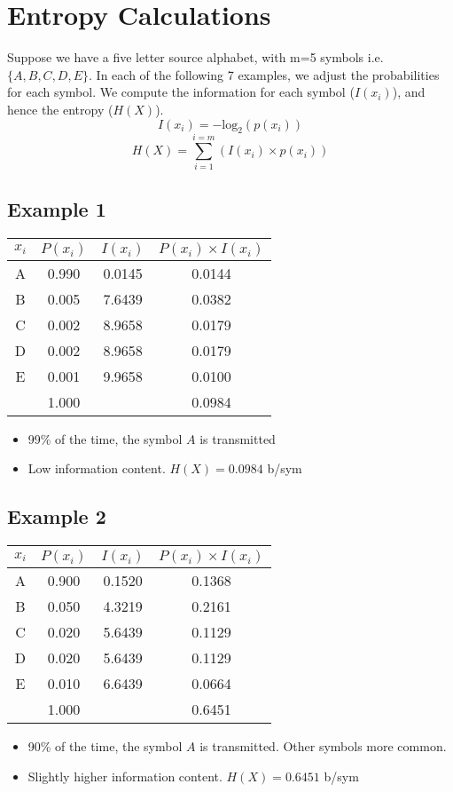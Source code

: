 \documentclass[12pt]{article}
\begin{document}
\section*{Entropy Calculations}
Suppose we have a five letter source alphabet, with m=5 symbols i.e. $\{A,B,C,D,E\}$.
In each of the following 7 examples, we adjust the probabilities for each symbol. We compute the information for each symbol ($I(x_i)$), and hence the entropy ($H(X)$).
\[ I(x_i) = -\mbox{log}_2(p(x_i)) \]
\[ H(X) = \sum^{i=m}_{i=1} (I(x_i) \times p(x_i)) \]
\subsection*{Example 1}
\begin{tabular}{|c|c|c|c|}
\hline
$x_i$	&	$P(x_i)$	&	$I(x_i)$	&	$P(x_i) \times I(x_i)$	\\ \hline	\hline
A	&	0.990	&	0.0145	&	0.0144	\\ \hline	
B	&	0.005	&	7.6439	&	0.0382	\\ \hline	
C	&	0.002	&	8.9658	&	0.0179	\\ \hline	
D	&	0.002	&	8.9658	&	0.0179	\\ \hline	
E	&	0.001	&	9.9658	&	0.0100	\\ \hline	
	&	1.000	&		&	0.0984	\\ \hline	
\end{tabular} 
\begin{itemize}
\item 99\% of the time, the symbol $A$ is transmitted
\item Low information content. $H(X) = 0.0984 $ b/sym
\end{itemize}





\subsection*{Example 2}
\begin{tabular}{|c|c|c|c|}
\hline
$x_i$	&	$P(x_i)$	&	$I(x_i)$	&	$P(x_i) \times I(x_i)$	\\ \hline	\hline
A	&	0.900	&	0.1520	&	0.1368	\\ \hline	
B	&	0.050	&	4.3219	&	0.2161	\\ \hline	
C	&	0.020	&	5.6439	&	0.1129	\\ \hline	
D	&	0.020	&	5.6439	&	0.1129	\\ \hline	
E	&	0.010	&	6.6439	&	0.0664	\\ \hline	
	&	1.000	&		&	0.6451	\\ \hline	
\end{tabular} 
\begin{itemize}
\item 90\% of the time, the symbol $A$ is transmitted. Other symbols more common.
\item Slightly higher information content. $H(X) = 0.6451 $ b/sym
\end{itemize}
\newpage
\end{document}

